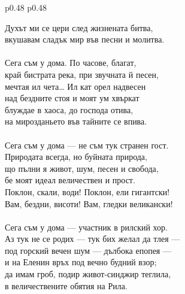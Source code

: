 \documentclass[12pt,a4paper]{article}
\begin{document}
\begin{tabular}{p{0.48\textwidth} p{0.48\textwidth}}
\begin{minipage}[t]{\linewidth}
Духът ми се цери след жизнената битва,\\
вкушавам сладък мир във песни и молитва.\\
\\
Сега съм у дома. По часове, благат,\\
край бистрата река, при звучната й песен,\\
мечтая ил чета… Ил кат орел надвесен\\
над бездните стоя и моят ум хвъркат\\
блуждае в хаоса, до господа отива,\\
на мирозданьето във тайните се впива.\\
\\
Сега съм у дома — не съм тук странен гост.\\
Природата всегда, но буйната природа,\\
що пълни я живот, шум, песен и свобода,\\
бе моят идеал величествен и прост.\\
Поклон, скали, води! Поклон, ели гигантски!\\
Вам, бездни, висоти! Вам, гледки великански!\\
\\
Сега съм у дома — участник в рилский хор.\\
Аз тук не се родих — тук бих желал да тлея —\\
под горский вечен шум — дълбока епопея —\\
и на Еленин връх под вечно будний взор;\\
да имам гроб, подир живот-синджир теглила,\\
\hspace*{1.0cm} в величествените обятия на Рила.\\
\end{minipage}
\end{tabular}
\end{document}
